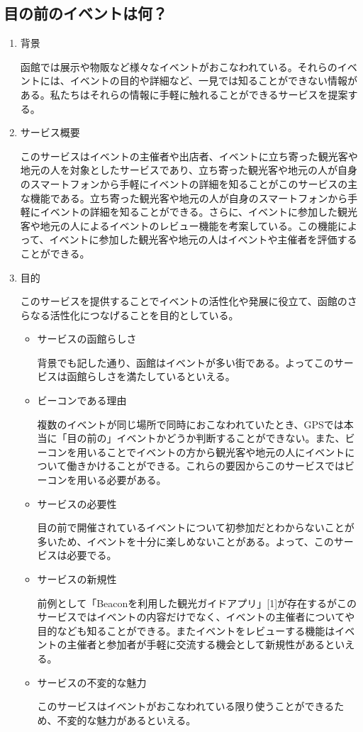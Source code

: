 \subsection{目の前のイベントは何？}
\begin{enumerate}
    \item 背景
    \par 函館では展示や物販など様々なイベントがおこなわれている。それらのイベントには、イベントの目的や詳細など、一見では知ることができない情報がある。私たちはそれらの情報に手軽に触れることができるサービスを提案する。
    \item サービス概要
    \par このサービスはイベントの主催者や出店者、イベントに立ち寄った観光客や地元の人を対象としたサービスであり、立ち寄った観光客や地元の人が自身のスマートフォンから手軽にイベントの詳細を知ることがこのサービスの主な機能である。立ち寄った観光客や地元の人が自身のスマートフォンから手軽にイベントの詳細を知ることができる。さらに、イベントに参加した観光客や地元の人によるイベントのレビュー機能を考案している。この機能によって、イベントに参加した観光客や地元の人はイベントや主催者を評価することができる。
    \item 目的
    \par このサービスを提供することでイベントの活性化や発展に役立て、函館のさらなる活性化につなげることを目的としている。    
\begin{itemize}
        \item サービスの函館らしさ
        \par 背景でも記した通り、函館はイベントが多い街である。よってこのサービスは函館らしさを満たしているといえる。
        \item ビーコンである理由
        \par 複数のイベントが同じ場所で同時におこなわれていたとき、GPSでは本当に「目の前の」イベントかどうか判断することができない。また、ビーコンを用いることでイベントの方から観光客や地元の人にイベントについて働きかけることができる。これらの要因からこのサービスではビーコンを用いる必要がある。
        \item サービスの必要性
        \par 目の前で開催されているイベントについて初参加だとわからないことが多いため、イベントを十分に楽しめないことがある。よって、このサービスは必要でる。
        \item サービスの新規性
        \par 前例として「Beaconを利用した観光ガイドアプリ」[1]が存在するがこのサービスではイベントの内容だけでなく、イベントの主催者についてや目的なども知ることができる。またイベントをレビューする機能はイベントの主催者と参加者が手軽に交流する機会として新規性があるといえる。
        \item サービスの不変的な魅力
        \par このサービスはイベントがおこなわれている限り使うことができるため、不変的な魅力があるといえる。
    \end{itemize}
\end{enumerate}

